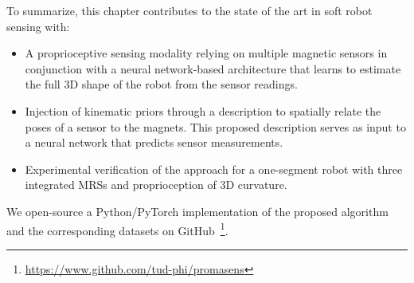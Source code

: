 To summarize, this chapter contributes to the state of the art in soft robot sensing with:
%
\begin{itemize}
    \item A proprioceptive sensing modality relying on multiple magnetic sensors in conjunction with a neural network-based architecture that learns to estimate the full 3D shape of the robot from the sensor readings. %
    \item Injection of kinematic priors through a description to spatially relate the poses of a sensor to the magnets. This proposed description serves as input to a neural network that predicts sensor measurements. %
    \item Experimental verification of the approach for a one-segment robot with three integrated \glspl{MRS} and proprioception of 3D curvature.    %
\end{itemize}
We open-source a Python/PyTorch implementation of the proposed algorithm and the corresponding datasets on GitHub~\footnote{\url{https://www.github.com/tud-phi/promasens}}.
